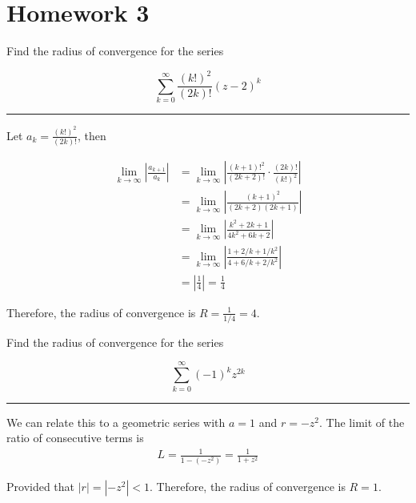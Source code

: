\chapter{Homework 3}

\begin{example}

    Find the radius of convergence for the series

    $$\sum_{k=0}^\infty\frac{(k!)^2}{(2k)!}(z-2)^k$$

    \hrule
    \vspace{0.5cm}

    Let $a_k = \frac{(k!)^2}{(2k)!}$, then

    \begin{align*}
        \lim_{k\to\infty}\left|\frac{a_{k+1}}{a_k}\right| & = \lim_{k\to\infty}\left|\frac{(k+1)!^2}{(2k+2)!}\cdot\frac{(2k)!}{(k!)^2}\right| \\
                                                          & = \lim_{k\to\infty}\left|\frac{(k+1)^2}{(2k+2)(2k+1)}\right|                      \\
                                                          & = \lim_{k\to\infty}\left|\frac{k^2+2k+1}{4k^2+6k+2}\right|                        \\
                                                          & = \lim_{k\to\infty}\left|\frac{1+2/k+1/k^2}{4+6/k+2/k^2}\right|                   \\
                                                          & = \left|\frac{1}{4}\right| = \frac{1}{4}
    \end{align*}

    Therefore, the radius of convergence is $R = \frac{1}{1/4} = 4$.

\end{example}


\begin{example}

    Find the radius of convergence for the series

    $$\sum_{k=0}^\infty(-1)^kz^{2k}$$

    \hrule
    \vspace{0.5cm}

    We can relate this to a geometric series with $a = 1$ and $r = -z^2$. The limit of the ratio of consecutive terms is
    \begin{align*}
        L = \frac{1}{1 - (-z^2)} = \frac{1}{1 + z^2}
    \end{align*}

    Provided that $|r| = |-z^2| < 1$. Therefore, the radius of convergence is $R = 1$.

\end{example}


